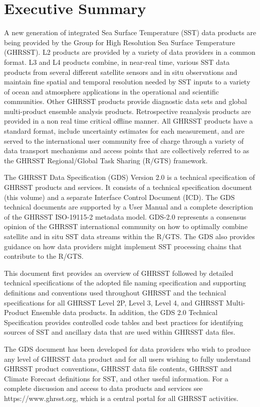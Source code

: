 \pagebreak\section{Executive Summary}
\par \vspace{0.5cm}
A new generation of integrated Sea Surface Temperature (SST) data products are being provided by the Group for High Resolution Sea Surface Temperature (GHRSST). L2 products are provided by a variety of data providers in a common format. L3 and L4 products combine, in near-real time, various SST data products from several different satellite sensors and in situ observations and maintain fine spatial and temporal resolution needed by SST inputs to a variety of ocean and atmosphere applications in the operational and scientific communities. Other GHRSST products provide diagnostic data sets and global multi-product ensemble analysis products. Retrospective reanalysis products are provided in a non real time critical offline manner. All GHRSST products have a standard format, include uncertainty estimates for each measurement, and are served to the international user community free of charge through a variety of data transport mechanisms and access points that are collectively referred to as the GHRSST Regional/Global Task Sharing (R/GTS) framework. 
\par \vspace{0.5cm}
\noindent The GHRSST Data Specification (GDS) Version 2.0 is a technical specification of GHRSST products and services. It consists of a technical specification document (this volume) and a separate Interface Control Document (ICD). The GDS technical documents are supported by a User Manual and a complete description of the GHRSST ISO-19115-2 metadata model. GDS-2.0 represents a consensus opinion of the GHRSST international community on how to optimally combine satellite and in situ SST data streams within the R/GTS. The GDS also provides guidance on how data providers might implement SST processing chains that contribute to the R/GTS.
\par \vspace{0.5cm}
\noindent This document first provides an overview of GHRSST followed by detailed technical specifications of the adopted file naming specification and supporting definitions and conventions used throughout GHRSST and the technical specifications for all GHRSST Level 2P, Level 3, Level 4, and GHRSST Multi-Product Ensemble data products. In addition, the GDS 2.0 Technical Specification provides controlled code tables and best practices for identifying sources of SST and ancillary data that are used within GHRSST data files.
\par \vspace{0.5cm}
\noindent The GDS document has been developed for data providers who wish to produce any level of GHRSST data product and for all users wishing to fully understand GHRSST product conventions, GHRSST data file contents, GHRSST and Climate Forecast definitions for SST, and other useful information. For a complete discussion and access to data products and services see https://www.ghrsst.org, which is a central portal for all GHRSST activities.
